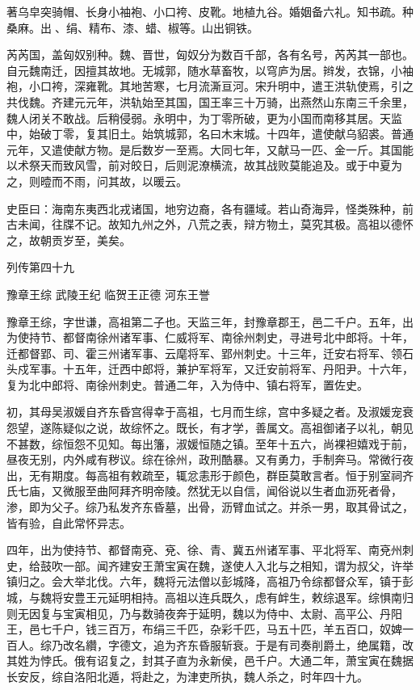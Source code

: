 \documentclass[12pt,UTF8]{ctexbook}
\begin{document}
著乌皁突骑帽、长身小袖袍、小口袴、皮靴。地植九谷。婚姻备六礼。知书疏。种桑麻。出、绢、精布、漆、蜡、椒等。山出铜铁。

芮芮国，盖匈奴别种。魏、晋世，匈奴分为数百千部，各有名号，芮芮其一部也。自元魏南迁，因擅其故地。无城郭，随水草畜牧，以穹庐为居。辫发，衣锦，小袖袍，小口袴，深雍靴。其地苦寒，七月流澌亘河。宋升明中，遣王洪轨使焉，引之共伐魏。齐建元元年，洪轨始至其国，国王率三十万骑，出燕然山东南三千余里，魏人闭关不敢战。后稍侵弱。永明中，为丁零所破，更为小国而南移其居。天监中，始破丁零，复其旧土。始筑城郭，名曰木末城。十四年，遣使献乌貂裘。普通元年，又遣使献方物。是后数岁一至焉。大同七年，又献马一匹、金一斤。其国能以术祭天而致风雪，前对皎日，后则泥潦横流，故其战败莫能追及。或于中夏为之，则曀而不雨，问其故，以暖云。

史臣曰：海南东夷西北戎诸国，地穷边裔，各有疆域。若山奇海异，怪类殊种，前古未闻，往牒不记。故知九州之外，八荒之表，辩方物土，莫究其极。高祖以德怀之，故朝贡岁至，美矣。





列传第四十九

豫章王综 武陵王纪 临贺王正德 河东王誉

豫章王综，字世谦，高祖第二子也。天监三年，封豫章郡王，邑二千户。五年，出为使持节、都督南徐州诸军事、仁威将军、南徐州刺史，寻进号北中郎将。十年，迁都督郢、司、霍三州诸军事、云麾将军、郢州刺史。十三年，迁安右将军、领石头戍军事。十五年，迁西中郎将，兼护军将军，又迁安前将军、丹阳尹。十六年，复为北中郎将、南徐州刺史。普通二年，入为侍中、镇右将军，置佐史。

初，其母吴淑媛自齐东昏宫得幸于高祖，七月而生综，宫中多疑之者。及淑媛宠衰怨望，遂陈疑似之说，故综怀之。既长，有才学，善属文。高祖御诸子以礼，朝见不甚数，综恒怨不见知。每出籓，淑媛恒随之镇。至年十五六，尚裸袒嬉戏于前，昼夜无别，内外咸有秽议。综在徐州，政刑酷暴。又有勇力，手制奔马。常微行夜出，无有期度。每高祖有敕疏至，辄忿恚形于颜色，群臣莫敢言者。恒于别室祠齐氏七庙，又微服至曲阿拜齐明帝陵。然犹无以自信，闻俗说以生者血沥死者骨，渗，即为父子。综乃私发齐东昏墓，出骨，沥臂血试之。并杀一男，取其骨试之，皆有验，自此常怀异志。

四年，出为使持节、都督南兗、兗、徐、青、冀五州诸军事、平北将军、南兗州刺史，给鼓吹一部。闻齐建安王萧宝寅在魏，遂使人入北与之相知，谓为叔父，许举镇归之。会大举北伐。六年，魏将元法僧以彭城降，高祖乃令综都督众军，镇于彭城，与魏将安豊王元延明相持。高祖以连兵既久，虑有衅生，敕综退军。综惧南归则无因复与宝寅相见，乃与数骑夜奔于延明，魏以为侍中、太尉、高平公、丹阳王，邑七千户，钱三百万，布绢三千匹，杂彩千匹，马五十匹，羊五百口，奴婢一百人。综乃改名纘，字德文，追为齐东昏服斩衰。于是有司奏削爵土，绝属籍，改其姓为悖氏。俄有诏复之，封其子直为永新侯，邑千户。大通二年，萧宝寅在魏据长安反，综自洛阳北遁，将赴之，为津吏所执，魏人杀之，时年四十九。
\end{document}
